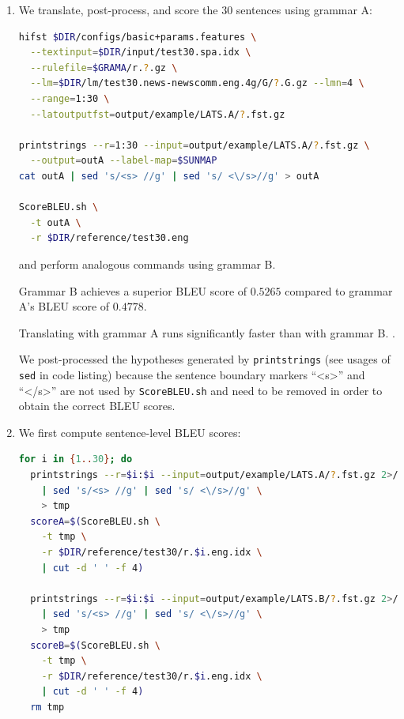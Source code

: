 \documentclass[a4paper,oneside,reqno]{amsart}
\begin{document}
\begin{enumerate}[label=\arabic*.]
  \item
    We translate, post-process, and score the 30 sentences using grammar A:
    \begin{lstlisting}[language=bash]
hifst $DIR/configs/basic+params.features \
  --textinput=$DIR/input/test30.spa.idx \
  --rulefile=$GRAMA/r.?.gz \
  --lm=$DIR/lm/test30.news-newscomm.eng.4g/G/?.G.gz --lmn=4 \
  --range=1:30 \
  --latoutputfst=output/example/LATS.A/?.fst.gz

printstrings --r=1:30 --input=output/example/LATS.A/?.fst.gz \
  --output=outA --label-map=$SUNMAP
cat outA | sed 's/<s> //g' | sed 's/ <\/s>//g' > outA

ScoreBLEU.sh \
  -t outA \
  -r $DIR/reference/test30.eng
    \end{lstlisting}
    and perform analogous commands using grammar B.

    Grammar B achieves a superior BLEU score of $0.5265$ compared to grammar
    A's BLEU score of $0.4778$.

    Translating with grammar A runs significantly faster than with grammar B. .

    We post-processed the hypotheses generated by \texttt{printstrings} (see
    usages of \texttt{sed} in code listing) because the sentence boundary
    markers ``<s>'' and ``</s>'' are not used by \texttt{ScoreBLEU.sh}
    and need to be removed in order to obtain the correct BLEU scores.

  \item We first compute sentence-level BLEU scores:
    \begin{lstlisting}[language=bash]
for i in {1..30}; do
  printstrings --r=$i:$i --input=output/example/LATS.A/?.fst.gz 2>/dev/null \
    | sed 's/<s> //g' | sed 's/ <\/s>//g' \
    > tmp
  scoreA=$(ScoreBLEU.sh \
    -t tmp \
    -r $DIR/reference/test30/r.$i.eng.idx \
    | cut -d ' ' -f 4)

  printstrings --r=$i:$i --input=output/example/LATS.B/?.fst.gz 2>/dev/null \
    | sed 's/<s> //g' | sed 's/ <\/s>//g' \
    > tmp
  scoreB=$(ScoreBLEU.sh \
    -t tmp \
    -r $DIR/reference/test30/r.$i.eng.idx \
    | cut -d ' ' -f 4)
  rm tmp


\end{lstlisting}
\end{enumerate}
\end{document}
